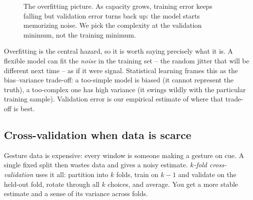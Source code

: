 \begin{figure}[H]
\centering
{}
\caption{The overfitting picture. As capacity grows, training error keeps falling but
validation error turns back up: the model starts memorizing noise. We pick the
complexity at the validation minimum, not the training minimum.}
\label{ch39:fig-overfit}
\end{figure}

\begin{whybox}
Overfitting is the central hazard, so it is worth saying precisely what it is. A flexible
model can fit the \emph{noise} in the training set -- the random jitter that will be
different next time -- as if it were signal. Statistical learning frames this as the
bias--variance trade-off: a too-simple model is biased (it cannot represent the truth),
a too-complex one has high variance (it swings wildly with the particular training
sample). Validation error is our empirical estimate of where that trade-off is best.
\end{whybox}

\subsection{Cross-validation when data is scarce}
\label{ch39:cv}

Gesture data is expensive: every window is someone making a gesture on cue. A single
fixed split then wastes data and gives a noisy estimate. \emph{$k$-fold cross-validation}
uses it all: partition into $k$ folds, train on $k-1$ and validate on the held-out fold,
rotate through all $k$ choices, and average. You get a more stable estimate and a sense
of its variance across folds.

